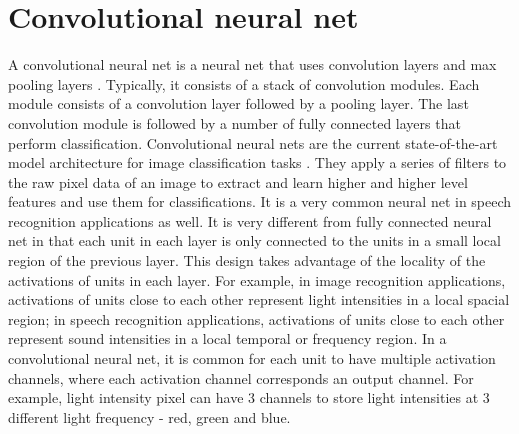 \section{Convolutional neural net}
A convolutional neural net is a neural net that uses convolution layers and max pooling layers \cite{krizhevsky2009learning}. Typically, it consists of a stack of convolution modules. Each module consists of a convolution layer followed by a pooling layer.
The last convolution module is followed by a number of fully connected layers that perform classification.
Convolutional neural nets are the current state-of-the-art model architecture for image classification tasks \cite{szegedy2015going} \cite{ioffe2015batch} \cite{szegedy2016rethinking}.
They apply a series of filters to the raw pixel data of an image to extract and learn higher and higher level features and use them  for classifications.
It is a very common neural net in speech recognition applications as well.
It is very different from fully connected neural net in that each unit in each layer is only connected to the units in a small local region of the previous layer.
This design takes advantage of the locality of the activations of units in each layer.
For example, in image recognition applications, activations of units close to each other represent light intensities in a local spacial region; in speech recognition applications, activations of units close to each other represent sound intensities in a local temporal or frequency region.
In a convolutional neural net, it is common for each unit to have multiple activation channels, where each activation channel corresponds an output channel.
For example, light intensity pixel can have 3 channels to store light intensities at 3 different light frequency - red, green and blue.

